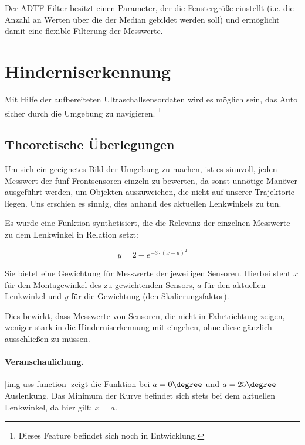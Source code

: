 \documentclass[a4paper,12pt]{report}
\begin{document}
	Der ADTF-Filter besitzt einen Parameter, der die Fenstergröße einstellt (i.e. die Anzahl an Werten über die der Median gebildet werden soll) und ermöglicht damit eine flexible Filterung der Messwerte.

\section{Hinderniserkennung}

	Mit Hilfe der aufbereiteten Ultraschallsensordaten wird es möglich sein, das Auto sicher durch die Umgebung zu navigieren.
	\footnote{Dieses Feature befindet sich noch in Entwicklung.} %

\subsection{Theoretische Überlegungen}

	Um sich ein geeignetes Bild der Umgebung zu machen, ist es sinnvoll, jeden  Messwert der fünf Frontsensoren einzeln zu bewerten, da sonst unnötige Manöver ausgeführt werden, um Objekten auszuweichen, die nicht auf unserer Trajektorie liegen.
	Uns erschien es sinnig, dies anhand des aktuellen Lenkwinkels zu tun.

	Es wurde eine Funktion synthetisiert, die die Relevanz der einzelnen Messwerte zu dem Lenkwinkel in Relation setzt:

		\[y=2-e^{-3 \cdot \left( x-a \right)^2}\]

	Sie bietet eine Gewichtung für Messwerte der jeweiligen Sensoren.
	Hierbei steht $x$ für den Montagewinkel des zu gewichtenden Sensors, $a$ für den aktuellen Lenkwinkel und $y$ für die Gewichtung (den Skalierungsfaktor).

	Dies bewirkt, dass Messwerte von Sensoren, die nicht in Fahrtrichtung zeigen, weniger stark in die Hinderniserkennung mit eingehen, ohne diese gänzlich ausschließen zu müssen.

	\paragraph{Veranschaulichung.} \autoref{img-uss-function} zeigt die Funktion bei $a = 0\degree$ und $a = 25\degree$ Auslenkung.
	Das Minimum der Kurve befindet sich stets bei dem aktuellen Lenkwinkel, da hier gilt: $x = a$.
\end{document}
